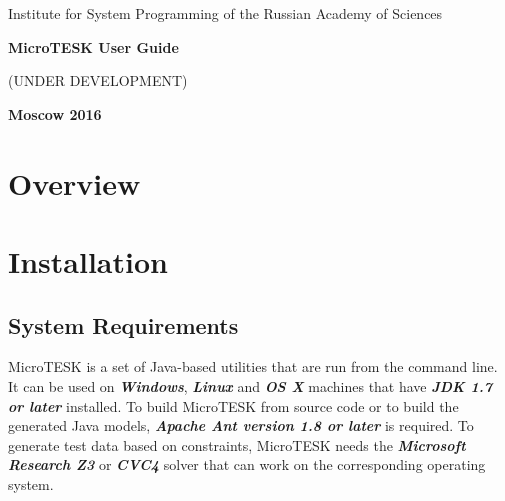 \documentclass[oneside,final,12pt]{extreport}
\begin{document}
\begin{titlepage}
\begin{center}
\Large{Institute for System Programming of the Russian Academy of Sciences}

\vfill


\bf\Large{MicroTESK User Guide}

(UNDER DEVELOPMENT)

\vfill

\bf
Moscow 2016
\end{center}
\end{titlepage}


\newpage
{} %
\tableofcontents


\chapter{Overview}


\chapter{Installation}

\section{System Requirements}

MicroTESK is a set of Java-based utilities that are run from the command line.
It can be used on \textbf{\textit{Windows}}, \textbf{\textit{Linux}} and
\textbf{\textit{OS X}} machines that have \textbf{\textit{JDK 1.7 or later}}
installed. To build MicroTESK from source code or to build the generated
Java models, \textbf{\textit{Apache Ant version 1.8 or later}} is required.
To generate test data based on constraints, MicroTESK needs
the \textbf{\textit{Microsoft Research Z3}} or \textbf{\textit{CVC4}} solver that
can work on the corresponding operating system.

\end{document}
